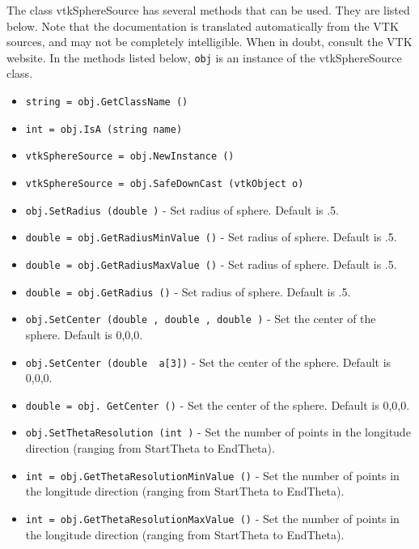 The class vtkSphereSource has several methods that can be used.
  They are listed below.
Note that the documentation is translated automatically from the VTK sources,
and may not be completely intelligible.  When in doubt, consult the VTK website.
In the methods listed below, \verb|obj| is an instance of the vtkSphereSource class.
\begin{itemize}
\item  \verb|string = obj.GetClassName ()|

\item  \verb|int = obj.IsA (string name)|

\item  \verb|vtkSphereSource = obj.NewInstance ()|

\item  \verb|vtkSphereSource = obj.SafeDownCast (vtkObject o)|

\item  \verb|obj.SetRadius (double )| -  Set radius of sphere. Default is .5.

\item  \verb|double = obj.GetRadiusMinValue ()| -  Set radius of sphere. Default is .5.

\item  \verb|double = obj.GetRadiusMaxValue ()| -  Set radius of sphere. Default is .5.

\item  \verb|double = obj.GetRadius ()| -  Set radius of sphere. Default is .5.

\item  \verb|obj.SetCenter (double , double , double )| -  Set the center of the sphere. Default is 0,0,0.

\item  \verb|obj.SetCenter (double  a[3])| -  Set the center of the sphere. Default is 0,0,0.

\item  \verb|double = obj. GetCenter ()| -  Set the center of the sphere. Default is 0,0,0.

\item  \verb|obj.SetThetaResolution (int )| -  Set the number of points in the longitude direction (ranging from
 StartTheta to EndTheta).

\item  \verb|int = obj.GetThetaResolutionMinValue ()| -  Set the number of points in the longitude direction (ranging from
 StartTheta to EndTheta).

\item  \verb|int = obj.GetThetaResolutionMaxValue ()| -  Set the number of points in the longitude direction (ranging from
 StartTheta to EndTheta).


\end{itemize}
